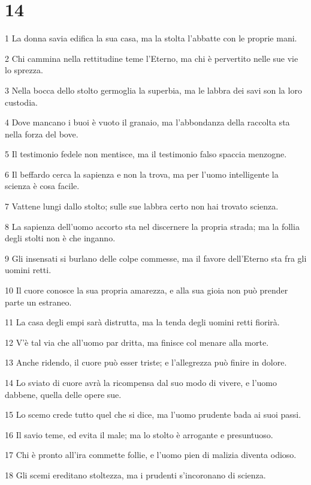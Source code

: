 \chapter{14}

\par 1 La donna savia edifica la sua casa, ma la stolta l'abbatte con le proprie mani.
\par 2 Chi cammina nella rettitudine teme l'Eterno, ma chi è pervertito nelle sue vie lo sprezza.
\par 3 Nella bocca dello stolto germoglia la superbia, ma le labbra dei savi son la loro custodia.
\par 4 Dove mancano i buoi è vuoto il granaio, ma l'abbondanza della raccolta sta nella forza del bove.
\par 5 Il testimonio fedele non mentisce, ma il testimonio falso spaccia menzogne.
\par 6 Il beffardo cerca la sapienza e non la trova, ma per l'uomo intelligente la scienza è cosa facile.
\par 7 Vattene lungi dallo stolto; sulle sue labbra certo non hai trovato scienza.
\par 8 La sapienza dell'uomo accorto sta nel discernere la propria strada; ma la follia degli stolti non è che inganno.
\par 9 Gli insensati si burlano delle colpe commesse, ma il favore dell'Eterno sta fra gli uomini retti.
\par 10 Il cuore conosce la sua propria amarezza, e alla sua gioia non può prender parte un estraneo.
\par 11 La casa degli empi sarà distrutta, ma la tenda degli uomini retti fiorirà.
\par 12 V'è tal via che all'uomo par dritta, ma finisce col menare alla morte.
\par 13 Anche ridendo, il cuore può esser triste; e l'allegrezza può finire in dolore.
\par 14 Lo sviato di cuore avrà la ricompensa dal suo modo di vivere, e l'uomo dabbene, quella delle opere sue.
\par 15 Lo scemo crede tutto quel che si dice, ma l'uomo prudente bada ai suoi passi.
\par 16 Il savio teme, ed evita il male; ma lo stolto è arrogante e presuntuoso.
\par 17 Chi è pronto all'ira commette follie, e l'uomo pien di malizia diventa odioso.
\par 18 Gli scemi ereditano stoltezza, ma i prudenti s'incoronano di scienza.
